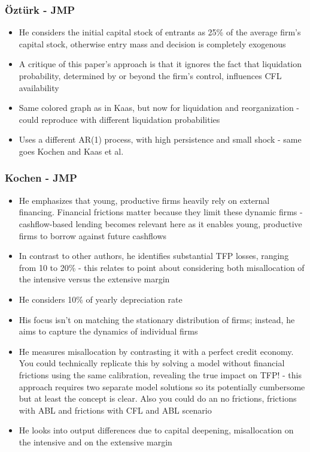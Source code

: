\documentclass[12pt]{article}
\begin{document}
\subsubsection*{Öztürk - JMP \checkmark}
\begin{itemize}\setlength\itemsep{0em} \small
    \item He considers the initial capital stock of entrants as 25\% of the average firm's capital stock, otherwise entry mass and decision is completely exogenous
    \item A critique of this paper's approach is that it ignores the fact that liquidation probability, determined by or beyond the firm's control, influences CFL availability
    \item Same colored graph as in Kaas, but now for liquidation and reorganization - could reproduce with different liquidation probabilities
    \item Uses a different AR(1) process, with high persistence and small shock - same goes Kochen and Kaas et al.
\end{itemize} \normalsize

\subsubsection*{Kochen - JMP}
\begin{itemize}\setlength\itemsep{0em} \small
    \item He emphasizes that young, productive firms heavily rely on external financing. Financial frictions matter because they limit these dynamic firms - cashflow-based lending becomes relevant here as it enables young, productive firms to borrow against future cashflows
    \item In contrast to other authors, he identifies substantial TFP losses, ranging from 10 to 20\% - this relates to point about considering both misallocation of the intensive versus the extensive margin
    \item He considers 10\% of yearly depreciation rate
    \item His focus isn't on matching the stationary distribution of firms; instead, he aims to capture the dynamics of individual firms
    \item He measures misallocation by contrasting it with a perfect credit economy. You could technically replicate this by solving a model without financial frictions using the same calibration, revealing the true impact on TFP! - this approach requires two separate model solutions so its potentially cumbersome but at least the concept is clear. Also you could do an no frictions, frictions with ABL and frictions with CFL and ABL scenario
    \item He looks into output differences due to capital deepening, misallocation on the intensive and on the extensive margin
\end{itemize} \normalsize
    
\end{document}
